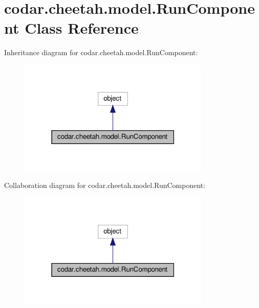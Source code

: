 \hypertarget{classcodar_1_1cheetah_1_1model_1_1_run_component}{}\section{codar.\+cheetah.\+model.\+Run\+Component Class Reference}
\label{classcodar_1_1cheetah_1_1model_1_1_run_component}


Inheritance diagram for codar.\+cheetah.\+model.\+Run\+Component\+:
\nopagebreak
\begin{figure}[H]
\begin{center}
\leavevmode
\includegraphics[width=259pt]{classcodar_1_1cheetah_1_1model_1_1_run_component__inherit__graph}
\end{center}
\end{figure}


Collaboration diagram for codar.\+cheetah.\+model.\+Run\+Component\+:
\nopagebreak
\begin{figure}[H]
\begin{center}
\leavevmode
\includegraphics[width=259pt]{classcodar_1_1cheetah_1_1model_1_1_run_component__coll__graph}
\end{center}
\end{figure}
